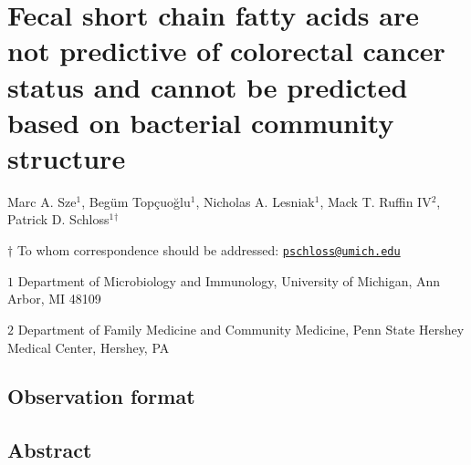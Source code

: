 \documentclass[11pt,]{article}
\title{}
\author{}
\date{}
\begin{document}
\vspace{35mm}

\hypertarget{fecal-short-chain-fatty-acids-are-not-predictive-of-colorectal-cancer-status-and-cannot-be-predicted-based-on-bacterial-community-structure}{%
\section{Fecal short chain fatty acids are not predictive of colorectal
cancer status and cannot be predicted based on bacterial community
structure}\label{fecal-short-chain-fatty-acids-are-not-predictive-of-colorectal-cancer-status-and-cannot-be-predicted-based-on-bacterial-community-structure}}

\vspace{35mm}

Marc A. Sze\({^1}\), Begüm Topçuoğlu\({^1}\), Nicholas A.
Lesniak\({^1}\), Mack T. Ruffin IV\({^2}\), Patrick D.
Schloss\({^1}\)\({^\dagger}\)

\vspace{40mm}

\(\dagger\) To whom correspondence should be addressed:
\href{mailto:pschloss@umich.edu}{\nolinkurl{pschloss@umich.edu}}

\(1\) Department of Microbiology and Immunology, University of Michigan,
Ann Arbor, MI 48109

\(2\) Department of Family Medicine and Community Medicine, Penn State
Hershey Medical Center, Hershey, PA

\vspace{10mm}

\hypertarget{observation-format}{%
\subsection{Observation format}\label{observation-format}}

\newpage
\linenumbers

\hypertarget{abstract}{%
\subsection{Abstract}\label{abstract}}
\end{document}
